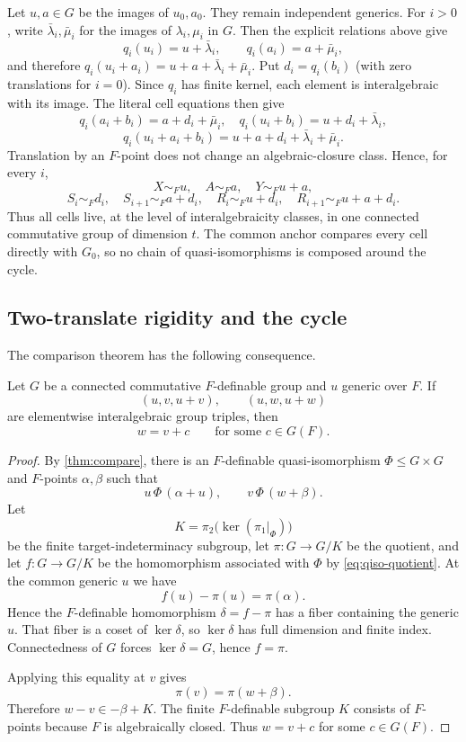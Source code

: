 \documentclass[11pt]{article}
\theoremstyle{definition}
\newcommand{\simF}{\mathrel{\sim_F}}
\begin{document}
Let $u,a\in G$ be the images of $u_0,a_0$.  They remain independent generics.  For $i>0$, write $\bar\lambda_i,\bar\mu_i$ for the images of $\lambda_i,\mu_i$ in $G$.  Then the explicit relations above give
\[
q_i(u_i)=u+\bar\lambda_i,\qquad q_i(a_i)=a+\bar\mu_i,
\]
and therefore $q_i(u_i+a_i)=u+a+\bar\lambda_i+\bar\mu_i$.  Put $d_i=q_i(b_i)$ (with zero translations for $i=0$).  Since $q_i$ has finite kernel, each element is interalgebraic with its image.  The literal cell equations then give
\[
q_i(a_i+b_i)=a+d_i+\bar\mu_i,\quad
q_i(u_i+b_i)=u+d_i+\bar\lambda_i,
\]
\[
q_i(u_i+a_i+b_i)=u+a+d_i+\bar\lambda_i+\bar\mu_i.
\]
Translation by an $F$-point does not change an algebraic-closure class.  Hence, for every $i$,
\begin{equation}\label{eq:anchored}
X\simF u,\quad A\simF a,\quad Y\simF u+a,
\end{equation}
\[
S_i\simF d_i,\quad S_{i+1}\simF a+d_i,
\quad R_i\simF u+d_i,\quad R_{i+1}\simF u+a+d_i.
\]
Thus all cells live, at the level of interalgebraicity classes, in one connected commutative group of dimension $t$.  The common anchor compares every cell directly with $G_0$, so no chain of quasi-isomorphisms is composed around the cycle.

\subsection{Two-translate rigidity and the cycle}

The comparison theorem has the following consequence.

\begin{lemma}\label{lem:translate}
Let $G$ be a connected commutative $F$-definable group and $u$ generic over $F$.  If
\[
(u,v,u+v),\qquad (u,w,u+w)
\]
are elementwise interalgebraic group triples, then
\[
w=v+c\qquad\text{for some }c\in G(F).
\]
\end{lemma}
\begin{proof}
By \cref{thm:compare}, there is an $F$-definable quasi-isomorphism $\Phi\le G\times G$ and $F$-points $\alpha,\beta$ such that
\[
u\,\Phi\,(\alpha+u),\qquad v\,\Phi\,(w+\beta).
\]
Let
\[
K=\pi_2\bigl(\ker(\pi_1|_\Phi)\bigr)
\]
be the finite target-indeterminacy subgroup, let $\pi:G\to G/K$ be the quotient, and let $f:G\to G/K$ be the homomorphism associated with $\Phi$ by \eqref{eq:qiso-quotient}.  At the common generic $u$ we have
\[
f(u)-\pi(u)=\pi(\alpha).
\]
Hence the $F$-definable homomorphism $\delta=f-\pi$ has a fiber containing the generic $u$.  That fiber is a coset of $\ker\delta$, so $\ker\delta$ has full dimension and finite index.  Connectedness of $G$ forces $\ker\delta=G$, hence $f=\pi$.

Applying this equality at $v$ gives
\[
\pi(v)=\pi(w+\beta).
\]
Therefore $w-v\in -\beta+K$.  The finite $F$-definable subgroup $K$ consists of $F$-points because $F$ is algebraically closed.  Thus $w=v+c$ for some $c\in G(F)$.
\end{proof}
\end{document}
